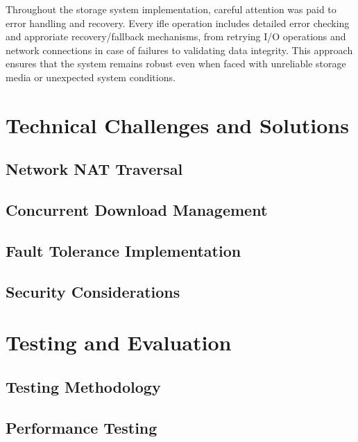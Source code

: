 \documentclass[12pt,a4paper]{report}
\begin{document}
Throughout the storage system implementation, careful attention was paid to error handling and recovery. Every ifle operation includes detailed error checking and approriate recovery/fallback mechanisms, from retrying I/O operations and network connections in case of failures to validating data integrity. This approach ensures that the system remains robust even when faced with unreliable storage media or unexpected system conditions.

\chapter{Technical Challenges and Solutions}
\section{Network NAT Traversal}


\section{Concurrent Download Management}

\section{Fault Tolerance Implementation}

\section{Security Considerations}

\chapter{Testing and Evaluation}
\section{Testing Methodology}

\section{Performance Testing}
\end{document}

